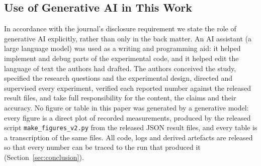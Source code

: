 \subsection{Use of Generative AI in This Work}
\label{subsec:genai}

In accordance with the journal's disclosure requirement we state the role of
generative AI explicitly, rather than only in the back matter. An AI assistant (a
large language model) was used as a writing and programming aid: it helped
implement and debug parts of the experimental code, and it helped edit the
language of text the authors had drafted. The authors conceived the study,
specified the research questions and the experimental design, directed and
supervised every experiment, verified each reported number against the released
result files, and take full responsibility for the content, the claims and their
accuracy. No figure or table in this paper was generated by a generative model:
every figure is a direct plot of recorded measurements, produced by the released
script \texttt{make\_figures\_v2.py} from the released JSON result files, and
every table is a transcription of the same files. All code, logs and derived
artefacts are released so that every number can be traced to the run that produced
it (Section~\ref{sec:conclusion}).

